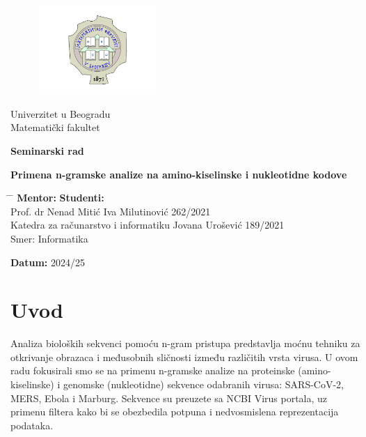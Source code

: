 \documentclass[a4paper,12pt]{article}
\begin{document}
\begin{titlepage}
    \centering
	\begin{figure}[htbp]
    	\centering
    	\includegraphics[width=0.4\textwidth]{images/logo.png}
	\end{figure}
    { Univerzitet u Beogradu \\ Matematički fakultet\par}
	
    \vfill

    {\Large \textbf{Seminarski rad}\par}

    \vspace{1cm}

    {\Large \textbf{Primena n-gramske analize na amino-kiselinske i nukleotidne kodove}\par}

    \vfill

    
	
	
	\begin{tabbing}
	\hspace{10cm} \= \hspace{10cm} \= \kill
	\textbf{Mentor:} \>  \textbf{Studenti:} \\
	Prof. dr Nenad Mitić \> Iva Milutinović 262/2021 \\
	Katedra za računarstvo i informatiku \> Jovana Urošević 189/2021 \\
	\> Smer: Informatika
	\end{tabbing}

    \vfill

    \textbf{Datum:} 2024/25

\end{titlepage}
\newpage
\tableofcontents
\newpage
\section{Uvod}
Analiza bioloških sekvenci pomoću n-gram pristupa predstavlja moćnu tehniku za otkrivanje obrazaca i međusobnih sličnosti između različitih vrsta virusa. 
U ovom radu fokusirali smo se na primenu n-gramske analize na proteinske (amino-kiselinske) i genomske (nukleotidne) sekvence odabranih virusa: SARS-CoV-2, MERS, Ebola i Marburg. 
Sekvence su preuzete sa NCBI Virus portala, uz primenu filtera kako bi se obezbedila potpuna i nedvosmislena reprezentacija podataka.
\end{document}
